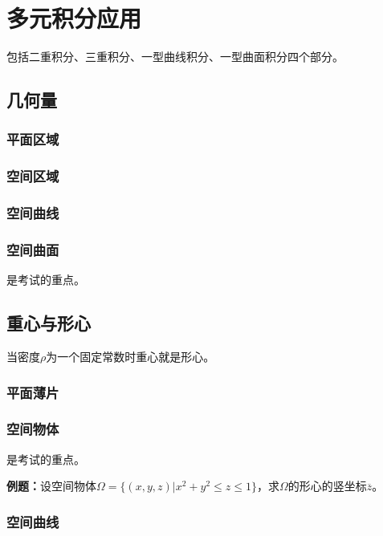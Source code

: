 \section{多元积分应用}

包括二重积分、三重积分、一型曲线积分、一型曲面积分四个部分。

\subsection{几何量}

\subsubsection{平面区域}

\subsubsection{空间区域}

\subsubsection{空间曲线}

\subsubsection{空间曲面}

是考试的重点。

\subsection{重心与形心}

当密度$\rho$为一个固定常数时重心就是形心。

\subsubsection{平面薄片}

\subsubsection{空间物体}

是考试的重点。

\textbf{例题：}设空间物体$\Omega=\{(x,y,z)|x^2+y^2\leqslant z\leqslant1\}$，求$\Omega$的形心的竖坐标$\overline{z}$。


\subsubsection{空间曲线}


